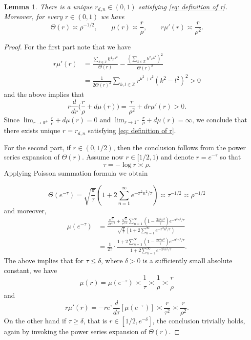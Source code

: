 \documentclass{article}
\newcommand{\Z}{\mathbb Z}
\theoremstyle{plain}
\newtheorem{lemma}[theorem]{Lemma}
\numberwithin{equation}{section}
\begin{document}
\begin{lemma} \label{lem: basic aproximation for mu}
    There is a unique $r_{d,n} \in (0,1)$ satisfying \eqref{eq: definition of r}. Moreover, for every $r \in (0,1)$ we have
    \[
    \Theta(r)\asymp \rho^{-1/2},\qquad
    \mu(r) \asymp \frac{r}{\rho}, \qquad r \mu'(r) \asymp \frac{r}{\rho^2}.
    \]
\end{lemma}
\begin{proof}
For the first part note that we have 
\begin{align*}
    r \mu'(r)&= \frac{\sum_{k \in \Z} k^4 r^{k^2}}{\Theta(r)}- \frac{\left(\sum_{k \in \Z} k^2 r^{k^2}\right)^2}{\Theta(r)^2} \\
    &= \frac{1}{2 \Theta(r)^2}\sum_{k,l \in \Z} r^{k^2+l^2}(k^2-l^2)^2>0
\end{align*}
and the above implies that 
\[
r \frac{d}{dr} \Big(\frac{r}{\rho}+d \mu(r) \Big)= \frac{r}{\rho^2}+d r \mu'(r)>0.
\]
Since $\lim_{r \to 0^+} \frac{r}{\rho}+ d \mu(r)=0$ and $\lim_{r \to 1^-} \frac{r}{\rho}+ d \mu(r)=\infty$, we conclude that there exists unique $r=r_{d,n}$ satisfying \eqref{eq: definition of r}.

For the second part, if $r \in (0,1/2)$, then the conclusion follows from the power series expansion of $\Theta(r)$. Assume now $r \in [1/2,1)$ and denote $r=e^{- \tau}$ so that
\[
 \tau= -\log r \asymp \rho.
\]
Applying Poisson summation formula we obtain

\[
 \Theta(e^{-\tau})
 =\sqrt{\frac{\pi}{\tau}}
 \left(1+2\sum_{n=1}^{\infty}e^{-\pi^2n^2/\tau}\right)
 \asymp \tau^{-1/2}\asymp\rho^{-1/2}
\]
and moreover,
\begin{align*}
\mu(e^{-\tau})&= \frac{\frac{\sqrt{\pi}}{2\tau^{3/2}}
+
\frac{\sqrt{\pi}}{\tau^{3/2}}
\sum_{n=1}^{\infty}
\left(
1-\frac{2\pi^2 n^2}{\tau}
\right)
e^{-\pi^2 n^2/\tau}}{\sqrt{\frac{\pi}{\tau}}
\left(
1+2\sum_{n=1}^{\infty} e^{-\pi^2 n^2/\tau}
\right)}\\
&= \frac{1}{2\tau} \cdot \frac{1+2\sum_{n=1}^{\infty}
\left(
1-\frac{2\pi^2 n^2}{\tau}
\right)
e^{-\pi^2 n^2/\tau}}{1+2\sum_{n=1}^{\infty} e^{-\pi^2 n^2/\tau}}.
\end{align*}
The above implies that for $\tau \le \delta$, where $\delta>0$ is a sufficiently small absolute constant, we have 
\[
\mu(r)= \mu(e^{-\tau}) \asymp \frac{1}{\tau} \asymp \frac{1}{\rho} \asymp \frac{r}{\rho}
\]
and
\[
r\mu'(r)= -re^{\tau}\frac{d}{d \tau}[\mu(e^{-\tau})] \asymp \frac{r}{\tau^2}  \asymp \frac{r}{\rho^2}.
\]
On the other hand if $\tau \ge \delta$, that is $ r \in [1/2, e^{-\delta}]$, the conclusion trivially holds, again by invoking the power series expansion of $\Theta(r)$.
\end{proof}
\end{document}
